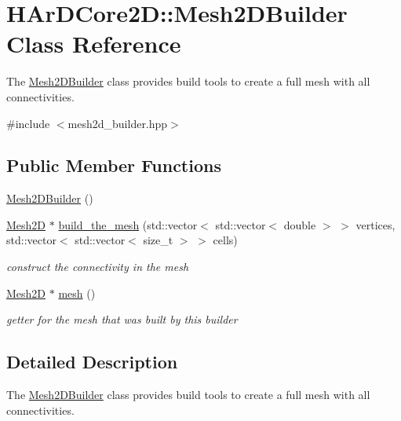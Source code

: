 \hypertarget{classHArDCore2D_1_1Mesh2DBuilder}{}\section{H\+Ar\+D\+Core2D\+:\+:Mesh2\+D\+Builder Class Reference}
\label{classHArDCore2D_1_1Mesh2DBuilder}


The \hyperlink{classHArDCore2D_1_1Mesh2DBuilder}{Mesh2\+D\+Builder} class provides build tools to create a full mesh with all connectivities.  




{\ttfamily \#include $<$mesh2d\+\_\+builder.\+hpp$>$}

\subsection*{Public Member Functions}
\begin{DoxyCompactItemize}
\item 
\hyperlink{classHArDCore2D_1_1Mesh2DBuilder_aace3b9d1ce3b4e0b53590b75f734dd96}{Mesh2\+D\+Builder} ()
\item 
\hyperlink{classHArDCore2D_1_1Mesh2D}{Mesh2D} $\ast$ \hyperlink{classHArDCore2D_1_1Mesh2DBuilder_a66379a977bf320cc456c4693b78707c8}{build\+\_\+the\+\_\+mesh} (std\+::vector$<$ std\+::vector$<$ double $>$ $>$ vertices, std\+::vector$<$ std\+::vector$<$ size\+\_\+t $>$ $>$ cells)
\begin{DoxyCompactList}\small\item\em construct the connectivity in the mesh \end{DoxyCompactList}\item 
\hyperlink{classHArDCore2D_1_1Mesh2D}{Mesh2D} $\ast$ \hyperlink{group__Mesh2D_ga1114eb09e456abb04ab7b5f2c98b958e}{mesh} ()
\begin{DoxyCompactList}\small\item\em getter for the mesh that was built by this builder \end{DoxyCompactList}\end{DoxyCompactItemize}


\subsection{Detailed Description}
The \hyperlink{classHArDCore2D_1_1Mesh2DBuilder}{Mesh2\+D\+Builder} class provides build tools to create a full mesh with all connectivities. 

